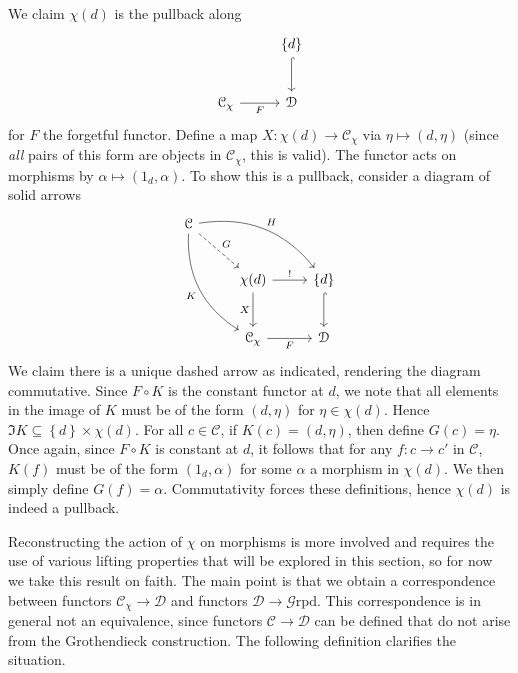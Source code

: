We claim $\chi (d)$ is the pullback along
\[\begin{tikzcd}[row sep = 2.5em, column sep = 2.5em]
 & \left\{ d \right\} \ar[hook, d]  \\
\mathcal{C} _\chi \ar[" F "', r]  & \mathcal{D} 
\end{tikzcd}\]
for $F$ the forgetful functor. Define a map $X : \chi (d)\to \mathcal{C} _\chi $ via $\eta \mapsto (d,\eta )$ (since \emph{all} pairs of this form are objects in $\mathcal{C} _\chi $, this is valid). The functor acts on morphisms by $\alpha \mapsto (1_d,\alpha )$. To show this is a pullback, consider a diagram of solid arrows
\[\begin{tikzcd}[row sep = 2.5em, column sep = 2.5em]
\mathcal{C} \ar[" H ", bend left, drr] \ar[" K "', bend right, ddr] \ar[" G ", dashed, dr]  &  &  \\
 & \chi (d) \ar[" ! ", r] \ar[" X "', d]  & \left\{ d \right\} \ar[hook, d]  \\
 & \mathcal{C} _\chi \ar[" F "', r]  & \mathcal{D} 
\end{tikzcd}\]
We claim there is a unique dashed arrow as indicated, rendering the diagram commutative. Since $F\circ K$ is the constant functor at $d$, we note that all elements in the image of $K$ must be of the form $(d,\eta )$ for $\eta \in \chi (d)$. Hence $\Im K \subseteq \left\{ d \right\} \times \chi (d)$. For all $c\in \mathcal{C} $, if $K(c)=(d,\eta )$, then define $G(c)=\eta $. Once again, since $F\circ K$ is constant at $d$, it follows that for any $f : c \to c'$ in $\mathcal{C} $, $K(f)$ must be of the form $(1_d,\alpha )$ for some $\alpha $ a morphism in $\chi (d)$. We then simply define $G(f)=\alpha $. Commutativity forces these definitions, hence $\chi (d)$ is indeed a pullback.

Reconstructing the action of $\chi $ on morphisms is more involved and requires the use of various lifting properties that will be explored in this section, so for now we take this result on faith. The main point is that we obtain a correspondence between functors $\mathcal{C} _\chi \to \mathcal{D} $ and functors $\mathcal{D} \to \mathcal{G} \mathrm{rpd} $. This correspondence is in general not an equivalence, since functors $\mathcal{C} \to \mathcal{D} $ can be defined that do not arise from the Grothendieck construction. The following definition clarifies the situation.

